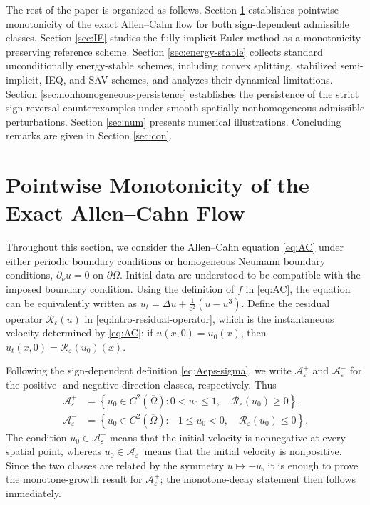 \documentclass[final, 3p, times]{elsarticle}%
\newcommand{\eps}{\varepsilon}
\newcommand{\Reps}{\mathcal R_\varepsilon}
\newcommand{\Aepsp}{\mathcal A_\varepsilon^+}
\newcommand{\Aeps}{\Aepsp}
\newcommand{\Aepsm}{\mathcal A_\varepsilon^-}
\begin{document}
The rest of the paper is organized as follows. Section \ref{sec:monotonicity}  establishes pointwise monotonicity of the exact Allen--Cahn flow for both sign-dependent admissible classes. Section \ref{sec:IE} studies the fully implicit Euler method as a monotonicity-preserving reference scheme. Section \ref{sec:energy-stable} collects standard unconditionally energy-stable schemes, including convex splitting, stabilized semi-implicit, IEQ, and SAV schemes, and analyzes their dynamical limitations. Section \ref{sec:nonhomogeneous-persistence} establishes the persistence of the strict sign-reversal counterexamples under smooth spatially nonhomogeneous admissible perturbations. Section \ref{sec:num} presents numerical illustrations. Concluding remarks are given in Section \ref{sec:con}.




\section{Pointwise Monotonicity of the Exact Allen--Cahn Flow}
\label{sec:monotonicity}
Throughout this section, we consider the Allen--Cahn equation \eqref{eq:AC} under either periodic boundary conditions or homogeneous Neumann boundary conditions,
$\partial_\nu u=0$ on $\partial\Omega$. Initial data are understood to be compatible with the imposed boundary condition.
Using the definition of \(f\) in \eqref{eq:AC}, the equation can be equivalently written as
$u_t=\Delta u+\frac{1}{\eps^2}(u-u^3).$
Define the residual operator $\Reps(u)$ in \eqref{eq:intro-residual-operator},
which is the instantaneous velocity determined by \eqref{eq:AC}: if
\(u(x,0)=u_0(x)\), then
$u_t(x,0)=\Reps(u_0)(x).$

Following the sign-dependent definition \eqref{eq:Aeps-sigma}, we write
\(\Aeps\) and \(\Aepsm\) for the positive- and negative-direction classes, respectively. Thus
\begin{equation}
\begin{aligned}
    \Aeps
    &=\left\{u_0\in C^2(\overline\Omega):
      0<u_0\le1,\quad \Reps(u_0)\ge0\right\},\\
    \Aepsm
    &=\left\{u_0\in C^2(\overline\Omega):
      -1\le u_0<0,\quad \Reps(u_0)\le0\right\}.
\end{aligned}
    \label{eq:admissible-negative-class}
\end{equation}
The condition \(u_0\in\Aeps\) means that the initial velocity is nonnegative at every spatial point, whereas \(u_0\in\Aepsm\) means that the initial velocity is nonpositive. Since the two classes are related by the symmetry \(u\mapsto -u\), it is enough to prove the monotone-growth result for \(\Aeps\); the monotone-decay statement then follows immediately.
\end{document}
